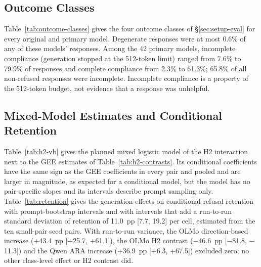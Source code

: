 \subsection{Outcome Classes}
\label{app:outcome-classes}

Table~\ref{tab:outcome-classes} gives the four outcome classes of
\S\ref{sec:setup-eval} for every original and primary model. Degenerate
responses were at most 0.6\% of any of these models' responses. Among the 42 primary
models, incomplete compliance (generation stopped at the 512-token limit)
ranged from 7.6\% to 79.9\% of responses and complete compliance from 2.3\%
to 61.3\%; 65.8\% of all non-refused responses were incomplete. Incomplete
compliance is a property of the 512-token budget, not evidence that a
response was unhelpful.



\subsection{Mixed-Model Estimates and Conditional Retention}
\label{app:rr-tables}

Table~\ref{tab:h2-vb} gives the planned mixed logistic model of the H2
interaction next to the GEE estimates of Table~\ref{tab:h2-contrasts}. Its
conditional coefficients have the same sign as the GEE coefficients in every
pair and pooled and are larger in magnitude, as expected for a conditional
model, but the model has no pair-specific slopes and its intervals describe
prompt sampling only. Table~\ref{tab:retention} gives the generation effects
on conditional refusal retention with prompt-bootstrap intervals and with
intervals that add a run-to-run standard deviation of retention of 11.0~pp
[7.7, 19.2] per cell, estimated from the ten small-pair seed pairs. With
run-to-run variance, the OLMo direction-based increase (+43.4~pp [+25.7,
+61.1]), the OLMo H2 contrast ($-$46.6~pp [$-$81.8, $-$11.3]) and the Qwen ARA
increase (+36.9~pp [+6.3, +67.5]) excluded zero; no other class-level effect
or H2 contrast did.



